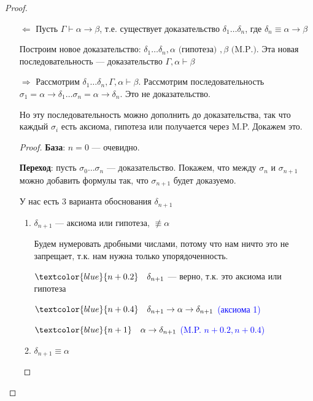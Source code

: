 \begin{proof}\itemfix
    \begin{itemize}
        \item [ \( \Leftarrow \)] Пусть \(\Gamma \vdash \alpha \to \beta\), т.е. существует доказательство \(\delta_1 \dots \delta_n\), где \(\delta_n \equiv \alpha \to \beta\)

              Построим новое доказательство: \(\delta_1 \dots \delta_n, \alpha \text{ (гипотеза) }, \beta \text{ (M.P.)}\). Эта новая последовательность --- доказательство \(\Gamma, \alpha \vdash \beta\)

        \item [ \( \Rightarrow \)] Рассмотрим \(\delta_1 \dots \delta_n, \Gamma, \alpha \vdash \beta\). Рассмотрим последовательность \(\sigma_1 = \alpha \to \delta_1 \dots \sigma_n = \alpha \to \delta_n\). Это не доказательство.

              Но эту последовательность можно дополнить до доказательства, так что каждый \(\sigma_i\) есть аксиома, гипотеза или получается через M.P. Докажем это.

              \begin{proof}
                  \textbf{База}: \(n = 0\) --- очевидно.

                  \textbf{Переход}: пусть \(\sigma_0 \dots \sigma_n\) --- доказательство. Покажем, что между \(\sigma_n\) и \(\sigma_{n + 1}\) можно добавить формулы так, что \(\sigma_{n + 1}\) будет доказуемо.

                  У нас есть 3 варианта обоснования \(\delta_{n + 1}\)
                  \begin{enumerate}
                      \item \(\delta_{n + 1}\) --- аксиома или гипотеза, \(\not\equiv \alpha\)

                            Будем нумеровать дробными числами, потому что нам ничто это не запрещает, т.к. нам нужна только упорядоченность.

                            \(\textcolor{blue}{n + 0.2} \quad \delta_{n + 1}\) --- верно, т.к. это аксиома или гипотеза

                            \(\textcolor{blue}{n + 0.4} \quad \delta_{n + 1} \to \alpha \to \delta_{n + 1}\) \textcolor{blue}{(аксиома 1)}

                            \(\textcolor{blue}{n + 1} \quad \alpha \to \delta_{n + 1}\) \textcolor{blue}{(M.P. \(n + 0.2, n + 0.4\))}

                      \item \(\delta_{n + 1} \equiv \alpha\)


\end{enumerate}
\end{proof}
\end{itemize}
\end{proof}
